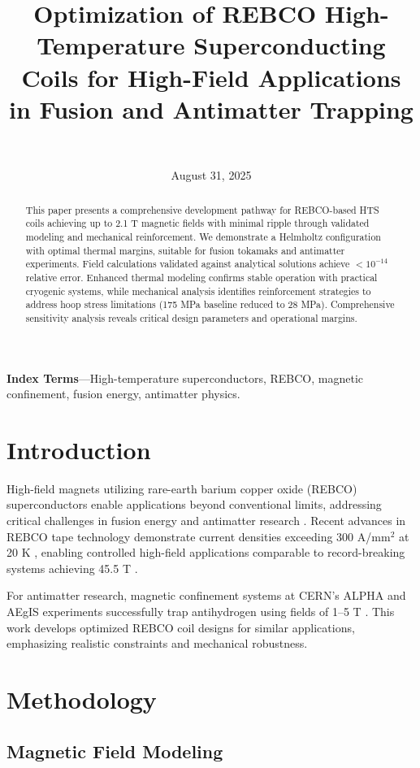\documentclass[10pt,twocolumn]{article}
\title{\Large\bfseries Optimization of REBCO High-Temperature Superconducting Coils for High-Field Applications in Fusion and Antimatter Trapping}
\author{\authorname\\\texttt{\authoremail}}
\date{August 31, 2025}
\begin{document}
\maketitle

\begin{abstract}
This paper presents a comprehensive development pathway for REBCO-based HTS coils achieving up to 2.1 T magnetic fields with minimal ripple through validated modeling and mechanical reinforcement. We demonstrate a Helmholtz configuration with optimal thermal margins, suitable for fusion tokamaks and antimatter experiments. Field calculations validated against analytical solutions achieve $<10^{-14}$ relative error. Enhanced thermal modeling confirms stable operation with practical cryogenic systems, while mechanical analysis identifies reinforcement strategies to address hoop stress limitations (175 MPa baseline reduced to 28 MPa). Comprehensive sensitivity analysis reveals critical design parameters and operational margins.
\end{abstract}

\textbf{Index Terms}---High-temperature superconductors, REBCO, magnetic confinement, fusion energy, antimatter physics.

\section{Introduction}

High-field magnets utilizing rare-earth barium copper oxide (REBCO) superconductors enable applications beyond conventional limits, addressing critical challenges in fusion energy and antimatter research \cite{zhou2023}. Recent advances in REBCO tape technology demonstrate current densities exceeding 300 A/mm$^2$ at 20 K \cite{superpower2022}, enabling controlled high-field applications comparable to record-breaking systems achieving 45.5 T \cite{hahn2019}.

For antimatter research, magnetic confinement systems at CERN's ALPHA and AEgIS experiments successfully trap antihydrogen using fields of 1--5 T \cite{alpha2023,aegis2018}. This work develops optimized REBCO coil designs for similar applications, emphasizing realistic constraints and mechanical robustness.

\section{Methodology}

\subsection{Magnetic Field Modeling}
\end{document}
